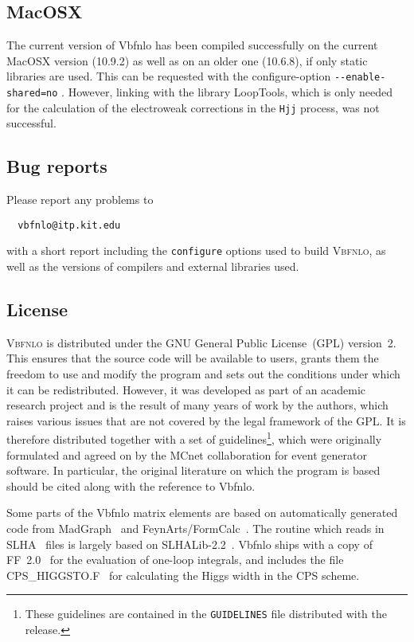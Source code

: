 \documentclass[english,12pt]{article}
\begin{document}
\subsection{MacOSX}

The current version of {\sc Vbfnlo} has been compiled successfully 
on the current MacOSX version (10.9.2) as well as on an older one
(10.6.8), if only static libraries are used. This can be
requested with the configure-option {\tt -{}-enable-shared=no} .
However, linking with the library {\sc LoopTools}, which is only
needed for the calculation of the electroweak corrections in the {\tt Hjj}
process, was not successful.



\subsection{Bug reports}

Please report any problems to
\begin{verbatim}
  vbfnlo@itp.kit.edu
\end{verbatim}
with a short report including the {\tt configure} options used to build
\textsc{Vbfnlo}, as well as the versions of compilers and external libraries
used.

\subsection{License}

\textsc{Vbfnlo} is distributed under the GNU General Public License~(GPL)
version~2. This ensures that the source code will be available to users,
grants them the freedom to use and modify the program and sets
out the conditions under which it can be redistributed. However, it was
developed as part of an academic research project and is the result of
many years of work by the authors, which raises various issues that are
not covered by the legal framework of the GPL. It is therefore
distributed together with a set of guidelines\footnote{These guidelines
are contained in the \texttt{GUIDELINES} file distributed with the
release.}, which were originally formulated and agreed on by the
MCnet collaboration for event generator software.
In particular, the original literature on which the program is based
should be cited along with the reference to {\sc Vbfnlo}.

Some parts of the {\sc Vbfnlo} matrix elements are based on automatically
generated code from {\sc MadGraph}~\cite{Stelzer:1994ta, Alwall:2007st}
and {\sc FeynArts/FormCalc}~\cite{Kublbeck:1990xc, Denner:1992vza, 
Kublbeck:1992mt, Hahn:2000kx, Hahn:2001rv, Hahn:1998yk, Hahn:2006zy, Hahn:2006qw}.
The routine which reads in SLHA~\cite{Allanach:2008qq} files is largely based 
on {\sc SLHALib-2.2}~\cite{Hahn:2006nq}.
{\sc Vbfnlo} ships with a copy of {\sc FF~2.0}~\cite{vanOldenborgh:1989wn}
for the evaluation of one-loop integrals, and includes the file {\sc
CPS\_HIGGSTO.F}~\cite{Passarino:2010qk,Goria:2011wa} for calculating the
Higgs width in the CPS scheme.
\end{document}
